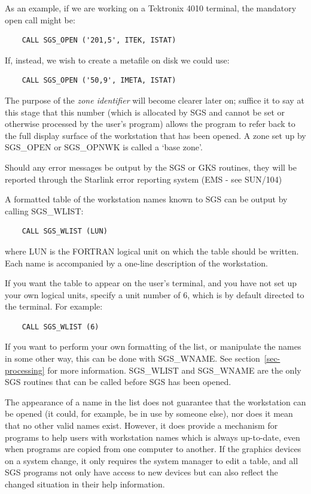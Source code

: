 \documentclass[11pt]{article}
\newcommand{\hyperref}[4]{#2\ref{#4}#3}
\newcommand{\htmlref}[2]{#1}
\newcommand{\xref}[3]{#1}
\begin{document}
As an example, if we are working on a Tektronix 4010 terminal, the mandatory
open call might be:
\begin{verbatim}
    CALL SGS_OPEN ('201,5', ITEK, ISTAT)
\end{verbatim}
If, instead, we wish to create a metafile on disk we could use:
\begin{verbatim}
    CALL SGS_OPEN ('50,9', IMETA, ISTAT)
\end{verbatim}

The purpose of the {\em zone identifier}\/ will become clearer later on; suffice
it to say at this stage that this number (which is allocated by SGS and cannot
be set or otherwise processed by the user's program) allows the program to refer
back to the full display surface of the workstation that has been opened.
A zone set up by SGS\_OPEN or
\htmlref{SGS\_OPNWK}{SGS_OPNWK} is called a `base zone'.

Should any error messages be output by the SGS or GKS routines, they will be
reported through the Starlink error reporting system (EMS - see
\xref{SUN/104}{sun104}{})

A formatted table of the workstation names known to SGS can be output by
calling \htmlref{SGS\_WLIST}{SGS_WLIST}:
\begin{verbatim}
    CALL SGS_WLIST (LUN)
\end{verbatim}
where LUN is the FORTRAN logical unit on which the table should be written.
Each name is accompanied by a one-line description of the workstation.

If you want the table to appear on the user's terminal, and you have not set up
your own logical units, specify a unit number of 6, which is by default directed
to the terminal.
For example:
\begin{verbatim}
    CALL SGS_WLIST (6)
\end{verbatim}
If you want to perform your own formatting of the list, or manipulate the names
in some other way, this can be done with \htmlref{SGS\_WNAME}{SGS_WNAME}.
See \hyperref{this section}{section~}{}{sec-processing}
for more information.
SGS\_WLIST and SGS\_WNAME are the only SGS routines that can be called before
SGS has been opened.

The appearance of a name in the list does not guarantee that the workstation can
be opened (it could, for example, be in use by someone else), nor does it mean
that no other valid names exist.
However, it does provide a mechanism for programs to help users with
workstation names which is always up-to-date, even when programs are copied
from one computer to another.
If the graphics devices on a system change, it only requires the system manager
to edit a table, and all SGS programs not only have access to new
devices but can also reflect the changed situation in their help information.
\end{document}
